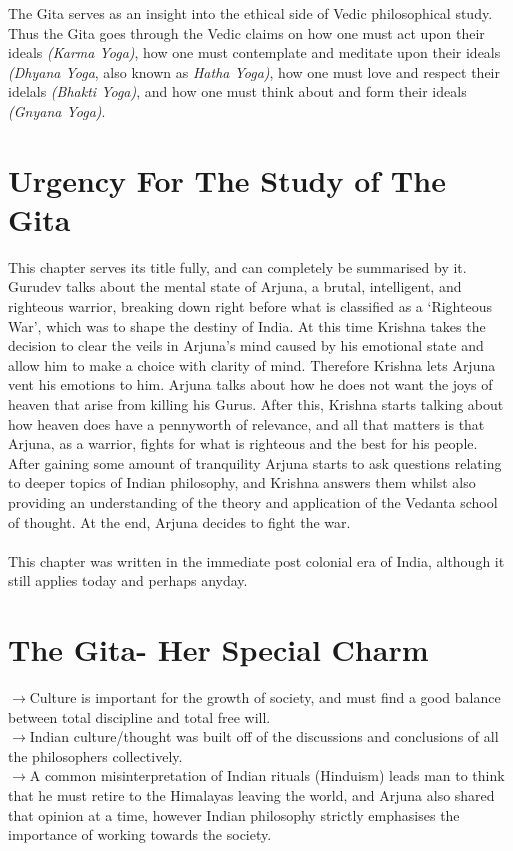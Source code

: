 \documentclass{article}
\newcommand{\tit}[1]{\textit{#1}}
\newcommand{\p}{\\$\to$\hspace{2mm}}
\begin{document}
The Gita serves as an insight into the ethical side of Vedic philosophical study. Thus the Gita goes through the Vedic claims on how one must act upon their ideals \tit{(Karma Yoga)}, how one must contemplate and meditate upon their ideals \tit{(Dhyana Yoga}, also known as \tit{Hatha Yoga)}, how one must love and respect their idelals \tit{(Bhakti Yoga)}, and how one must think about and form their ideals \tit{(Gnyana Yoga)}.
\newpage \section{Urgency For The Study of The Gita}
This chapter serves its title fully, and can completely be summarised by it. Gurudev talks about the mental state of Arjuna, a brutal, intelligent, and righteous warrior, breaking down right before what is classified as a `Righteous War', which was to shape the destiny of India. At this time Krishna takes the decision to clear the veils in Arjuna's mind caused by his emotional state and allow him to make a choice with clarity of mind. Therefore Krishna lets Arjuna vent his emotions to him. Arjuna talks about how he does not want the joys of heaven that arise from killing his Gurus. After this, Krishna starts talking about how heaven does have a pennyworth of relevance, and all that matters is that Arjuna, as a warrior, fights for what is righteous and the best for his people. After gaining some amount of tranquility Arjuna starts to ask questions relating to deeper topics of Indian philosophy, and Krishna answers them whilst also providing an understanding of the theory and application of the Vedanta school of thought. At the end, Arjuna decides to fight the war.
\\
\\This chapter was written in the immediate post colonial era of India, although it still applies today and perhaps anyday.
\newpage \section{The Gita- Her Special Charm}
$\to$\hspace{2mm}Culture is important for the growth of society, and must find a good balance between total discipline and total free will.
\p Indian culture/thought was built off of the discussions and conclusions of all the philosophers collectively.
\p A common misinterpretation of Indian rituals (Hinduism) leads man to think that he must retire to the Himalayas leaving the world, and Arjuna also shared that opinion at a time, however Indian philosophy strictly emphasises the importance of working towards the society.
\end{document}
